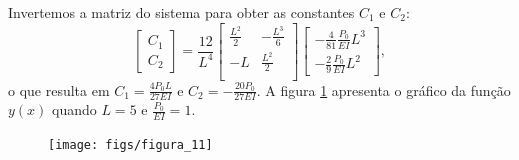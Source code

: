 \documentclass[a4paper,10pt]{book}
\begin{document}
 Invertemos a matriz do sistema para obter as constantes $C_1$ e $C_2$:
\begin{equation}\left[\begin{array}{c}
C_1\\
C_2\end{array}
\right]=
\frac{12}{L^4}
\left[\begin{array}{cc}
\frac{L^2}{2} & -\frac{L^3}{6}\\
-L & \frac{L^2}{2}\\
\end{array}
\right]\left[\begin{array}{c}
-\frac{4}{81}\frac{P_0}{EI}L^3\\
-\frac{2}{9}\frac{P_0}{EI}L^2\end{array}
\right],
\end{equation}
 o que resulta em $C_1=\frac{4P_0 L}{27EI}$ e $C_2=-\frac{20P_0 }{27EI}$. A figura \ref{viga} apresenta o gráfico da função $y(x)$ quando $L=5$ e $\frac{P_0}{EI}=1$.
 \begin{figure}[!ht]
 \begin{center}
 \texttt{[image: figs/figura\_11]}\end{center}
 \caption{\label{viga}}
 \end{figure}
\end{document}
